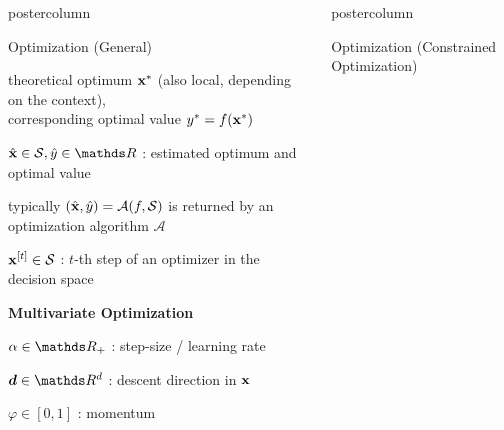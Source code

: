 \documentclass[11pt,compress,t,notes=noshow, xcolor=table]{beamer}
\newlength{\columnheight} %
\begin{document}
\begin{frame}[fragile]{}
\begin{columns}
\begin{column}{.31\textwidth}
\begin{beamercolorbox}[center]{postercolumn}
\begin{minipage}{.98\textwidth}
{\begin{myblock}{Optimization (General)}
\begin{codebox}
						\end{codebox}
						\hspace*{1ex} theoretical optimum $\mathbf{x}^\ast$ (also local, depending on the context), \\
                        \hspace*{1ex} corresponding optimal value $y^\ast = f(\mathbf{x}^\ast)$ \\
						\begin{codebox}
							 $\hat\xv \in \mathcal{S}, \hat y \in \R$ : estimated optimum and optimal value
						\end{codebox}
						\hspace*{1ex} typically $(\hat{\mathbf{x}}, \hat y) = \mathcal{A}(f,\mathcal{S})$ is returned by an optimization algorithm $\mathcal{A}$ \\
						\begin{codebox}
							 $\mathbf{x}^{[t]} \in \mathcal{S}$ : $t$-th step of an optimizer in the decision space
						\end{codebox}
						\vspace*{2ex} \textbf{Multivariate Optimization}\\
							\begin{codebox}
								 $\alpha \in \R_+$ : step-size / learning rate
							\end{codebox}
							\hspace*{1ex}
							\begin{codebox}
								 $\bm{d} \in \R^d$ : descent direction in $\mathbf{x}$
							\end{codebox}
							\hspace*{1ex}
							\begin{codebox}
								 $\varphi \in [0, 1]$ : momentum
							\end{codebox}
						\end{myblock}									
					}
			\end{minipage}
		\end{beamercolorbox}
	\end{column}
	\begin{column}{.31\textwidth}
		\begin{beamercolorbox}[center]{postercolumn}
			\begin{minipage}{.98\textwidth}
				\parbox[t][\columnheight]{\textwidth}{
                    \begin{myblock}{Optimization (Constrained Optimization)}

\end{myblock}}
\end{minipage}
\end{beamercolorbox}
\end{column}
\end{columns}
\end{frame}
\end{document}
